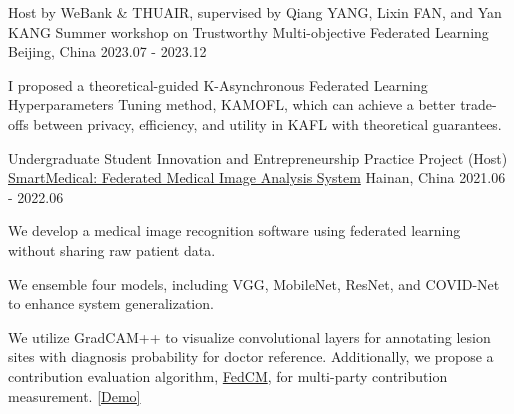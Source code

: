 \begin{cventries}
\cventry
{Host by WeBank \& THUAIR, supervised by Qiang YANG, Lixin FAN, and Yan KANG} %
{Summer workshop on Trustworthy Multi-objective Federated Learning} %
{Beijing, China} %
{2023.07 - 2023.12} %
{
    \begin{cvitems}
        \item {I proposed a theoretical-guided K-Asynchronous Federated Learning Hyperparameters Tuning method, KAMOFL, which can achieve a better trade-offs between privacy, efficiency, and utility in KAFL with theoretical guarantees.}
    \end{cvitems}
}


\cventry
{Undergraduate Student Innovation and Entrepreneurship Practice Project (Host)} %
{\href{https://www.bj-yan.top/paddle-fl-gui/}{SmartMedical: Federated Medical Image Analysis System}} %
{Hainan, China} %
{2021.06 - 2022.06} %
{
    \begin{cvitems}
        \item {We develop a medical image recognition software using federated learning without sharing raw patient data.}
        \item {We ensemble four models, including VGG, MobileNet, ResNet, and COVID-Net to enhance system generalization.}
        \item {We utilize GradCAM++ to visualize convolutional layers for annotating lesion sites with diagnosis probability for doctor reference. 
            Additionally, we propose a contribution evaluation algorithm, \href{https://ieeexplore.ieee.org/abstract/document/9534451/}{FedCM}, for multi-party contribution measurement.
            \textcolor{awesome-red}{\href{https://www.bj-yan.top/paddle-fl-gui/}{[Demo]}}
        }
    \end{cvitems}
}



\end{cventries}



